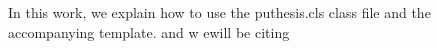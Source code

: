 In this work, we explain how to use the puthesis.cls class file and the accompanying template.  
and w ewill be citing~\cite{lamport1998paxos}